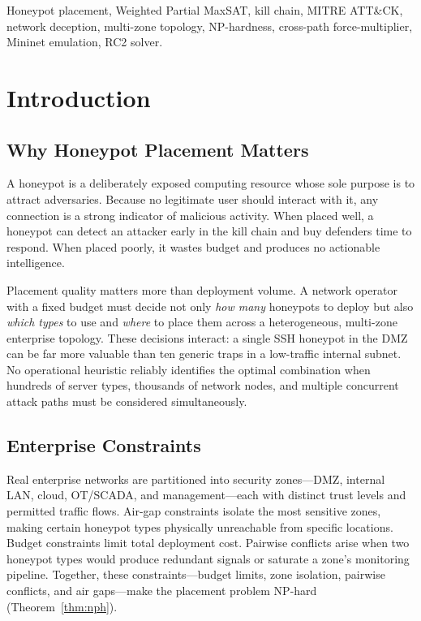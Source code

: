 \documentclass[journal]{IEEEtran}
\begin{document}
\begin{IEEEkeywords}
Honeypot placement, Weighted Partial MaxSAT, kill chain, MITRE
ATT\&CK, network deception, multi-zone topology, NP-hardness,
cross-path force-multiplier, Mininet emulation, RC2 solver.
\end{IEEEkeywords}

\section{Introduction}
\label{sec:intro}

\subsection{Why Honeypot Placement Matters}
A honeypot is a deliberately exposed computing resource whose sole
purpose is to attract adversaries. Because no legitimate user should
interact with it, any connection is a strong indicator of malicious
activity. When placed well, a honeypot can detect an attacker early
in the kill chain and buy defenders time to respond. When placed
poorly, it wastes budget and produces no actionable intelligence.

Placement quality matters more than deployment volume. A network
operator with a fixed budget must decide not only \emph{how many}
honeypots to deploy but also \emph{which types} to use and \emph{where}
to place them across a heterogeneous, multi-zone enterprise topology.
These decisions interact: a single SSH honeypot in the DMZ can be far
more valuable than ten generic traps in a low-traffic internal subnet.
No operational heuristic reliably identifies the optimal combination
when hundreds of server types, thousands of network nodes, and multiple
concurrent attack paths must be considered simultaneously.

\subsection{Enterprise Constraints}
Real enterprise networks are partitioned into security zones---DMZ,
internal LAN, cloud, OT/SCADA, and management---each with distinct
trust levels and permitted traffic flows. Air-gap constraints isolate
the most sensitive zones, making certain honeypot types physically
unreachable from specific locations. Budget constraints limit total
deployment cost. Pairwise conflicts arise when two honeypot types
would produce redundant signals or saturate a zone's monitoring
pipeline. Together, these constraints---budget limits, zone isolation,
pairwise conflicts, and air gaps---make the placement problem NP-hard
(Theorem~\ref{thm:nph}).
\end{document}
